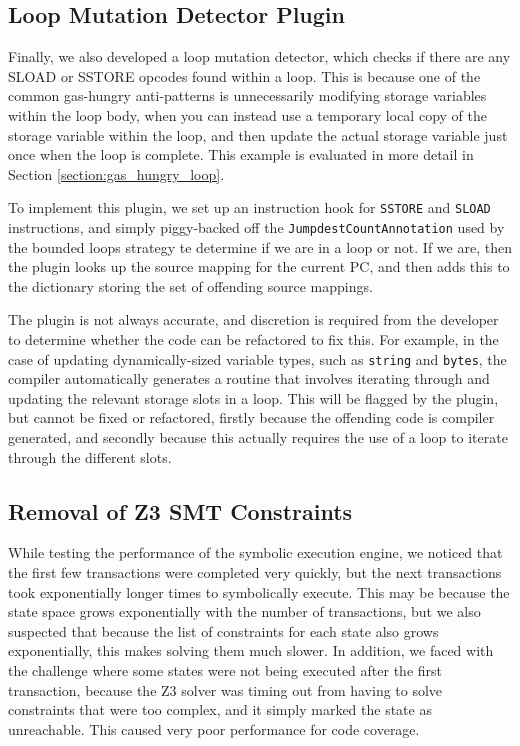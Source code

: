 \subsection{Loop Mutation Detector Plugin}

Finally, we also developed a loop mutation detector, which checks if there are any SLOAD or SSTORE
opcodes found within a loop. This is because one of the common gas-hungry anti-patterns is unnecessarily
modifying storage variables within the loop body, when you can instead use a temporary local copy of the storage 
variable within the loop, and then update the actual storage variable just once when the loop is complete. This example is evaluated
in more detail in Section \ref{section:gas_hungry_loop}. 

To implement this plugin, we set up an instruction hook for \texttt{SSTORE} and \texttt{SLOAD}
instructions, and simply piggy-backed off the \texttt{JumpdestCountAnnotation} used by
the bounded loops strategy te determine if we are in a loop or not. If we are, then the plugin looks
up the source mapping for the current PC, and then adds this to the dictionary storing the set of 
offending source mappings.

The plugin is not always accurate, and discretion is required from the developer to determine whether 
the code can be refactored to fix this. For example, in the case of updating dynamically-sized variable types,
such as \texttt{string} and \texttt{bytes}, the compiler automatically generates a routine that involves
iterating through and updating the relevant storage slots in a loop. This will be flagged by the plugin, 
but cannot be fixed or refactored, firstly because the offending code is compiler generated, and secondly 
because this actually requires the use of a loop to iterate through the different slots.

\subsection{Removal of Z3 SMT Constraints}

While testing the performance of the symbolic execution engine, we noticed that the first few transactions
were completed very quickly, but the next transactions took exponentially longer times to symbolically execute.
This may be because the state space grows exponentially with the number of transactions, but we also suspected
that because the list of constraints for each state also grows exponentially, this makes solving them much slower.
In addition, we faced with the challenge where some states were not being executed after the first transaction, 
because the Z3 solver was timing out from having to solve constraints that were too complex, and it simply marked 
the state as unreachable. This caused very poor performance for code coverage.

